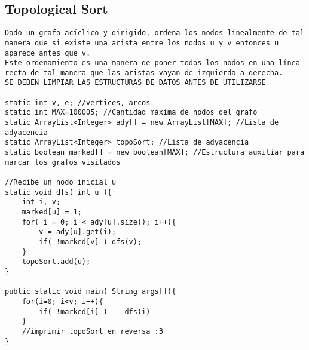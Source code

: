 \documentclass[10pt,letterpaper,twocolumn,twosided]{article}
\begin{document}
\subsection{Topological Sort}
\begin{lstlisting}
Dado un grafo acíclico y dirigido, ordena los nodos linealmente de tal manera que si existe una arista entre los nodos u y v entonces u aparece antes que v.
Este ordenamiento es una manera de poner todos los nodos en una línea recta de tal manera que las aristas vayan de izquierda a derecha.
SE DEBEN LIMPIAR LAS ESTRUCTURAS DE DATOS ANTES DE UTILIZARSE

static int v, e; //vertices, arcos
static int MAX=100005; //Cantidad máxima de nodos del grafo
static ArrayList<Integer> ady[] = new ArrayList[MAX]; //Lista de adyacencia
static ArrayList<Integer> topoSort; //Lista de adyacencia
static boolean marked[] = new boolean[MAX]; //Estructura auxiliar para marcar los grafos visitados

//Recibe un nodo inicial u
static void dfs( int u ){
	int i, v;
	marked[u] = 1;
	for( i = 0; i < ady[u].size(); i++){
		v = ady[u].get(i);
		if( !marked[v] ) dfs(v);
	}
	topoSort.add(u);
}

public static void main( String args[]){
	for(i=0; i<v; i++){
		if( !marked[i] )	dfs(i)
	}
	//imprimir topoSort en reversa :3
}

\end{lstlisting}
\end{document}

